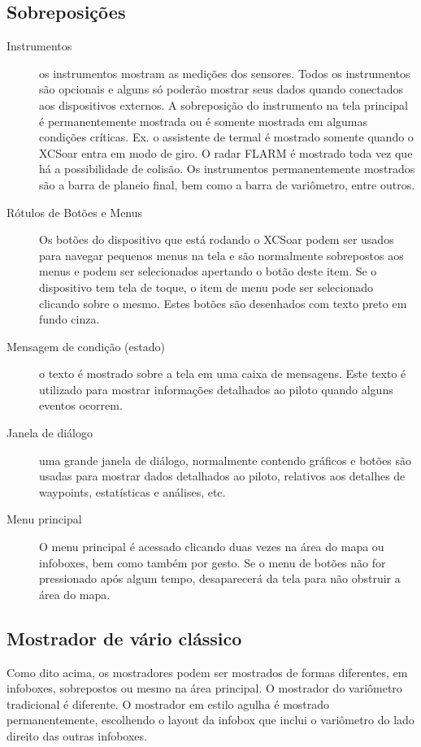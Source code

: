 \subsection*{Sobreposições}
\begin{description}
\item[Instrumentos]  os instrumentos mostram as medições dos sensores.  Todos os instrumentos são opcionais e alguns só poderão mostrar seus dados quando conectados aos dispositivos externos.  A sobreposição do instrumento na tela principal é permanentemente mostrada ou é somente mostrada em algumas condições críticas.  Ex. o assistente de termal é mostrado somente quando o XCSoar entra em modo de giro.  O radar FLARM é mostrado toda vez que há a possibilidade de colisão.  Os instrumentos permanentemente mostrados são a barra de planeio final, bem como a barra de variômetro, entre outros.

\item[Rótulos de Botões e Menus] Os botões do dispositivo que está rodando o XCSoar podem ser usados para navegar pequenos menus na tela e são normalmente sobrepostos aos menus e podem ser selecionados apertando o botão deste item.  Se o dispositivo tem tela de toque, o item de menu pode ser selecionado clicando sobre o mesmo.  Estes botões são desenhados com texto preto em fundo cinza. 

\item[Mensagem de condição (estado)]o texto é mostrado sobre a tela em uma caixa de mensagens.  Este texto é utilizado para mostrar informações detalhados ao piloto quando alguns eventos ocorrem.

\item[Janela de diálogo] uma grande janela de diálogo, normalmente contendo gráficos e botões são usadas para mostrar dados detalhados ao piloto, relativos aos detalhes de waypoints, estatísticas e análises, etc.

\item[Menu principal] O menu principal é acessado clicando duas vezes na área do mapa ou infoboxes, bem como também por gesto.  Se o menu de botões não for pressionado após algum tempo, desaparecerá da tela para não obstruir a área do mapa. 
\end{description}

\subsection*{Mostrador de vário clássico}
Como dito acima, os mostradores podem ser mostrados de formas diferentes, em infoboxes, sobrepostos ou mesmo na área principal.  O mostrador do variômetro tradicional é diferente.  O mostrador em estilo agulha é mostrado permanentemente, escolhendo o layout da infobox que inclui o variômetro do lado direito das outras infoboxes.

